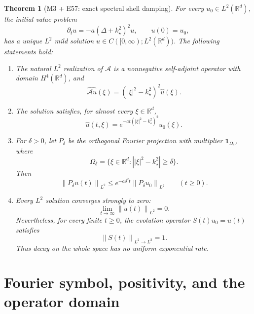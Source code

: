 \documentclass[11pt]{article}
\newtheorem{theorem}{Theorem}[section]
\theoremstyle{remark}
\newcommand{\R}{\mathbb{R}}
\newcommand{\sA}{\mathcal{A}}
\newcommand{\norm}[1]{\left\lVert #1\right\rVert}
\newcommand{\abs}[1]{\left\lvert #1\right\rvert}
\begin{document}
\begin{theorem}[M3 + E57: exact spectral shell damping]\label{thm:main}
For every $u_0\in L^2(\R^d)$, the initial-value problem
\begin{equation}\label{eq:flow}
\partial_tu=-a(\Delta+k_\star^2)^2u,
\qquad u(0)=u_0,
\end{equation}
has a unique $L^2$ mild solution $u\in C([0,\infty);L^2(\R^d))$.
The following statements hold:
\begin{enumerate}[label=\textup{(\roman*)}]
\item The natural $L^2$ realization of $\sA$ is a nonnegative
self-adjoint operator with domain $H^4(\R^d)$, and
\begin{equation}\label{eq:symbol}
\boxed{\widehat{\sA u}(\xi)
=(\abs{\xi}^2-k_\star^2)^2\widehat u(\xi).}
\end{equation}
\item The solution satisfies, for almost every $\xi\in\R^d$,
\begin{equation}\label{eq:semigroup}
\boxed{\widehat u(t,\xi)
=e^{-at(\abs{\xi}^2-k_\star^2)^2}\widehat u_0(\xi).}
\end{equation}
\item For $\delta>0$, let $P_\delta$ be the orthogonal Fourier projection
with multiplier $\mathbf 1_{\Omega_\delta}$, where
\begin{equation}\label{eq:omega}
\Omega_\delta
=\{\xi\in\R^d:\abs{\abs{\xi}^2-k_\star^2}\ge\delta\}.
\end{equation}
Then
\begin{equation}\label{eq:off-shell}
\boxed{\norm{P_\delta u(t)}_{L^2}
\le e^{-a\delta^2t}\norm{P_\delta u_0}_{L^2}}
\qquad (t\ge0).
\end{equation}
\item Every $L^2$ solution converges strongly to zero:
\begin{equation}\label{eq:strong-decay}
\lim_{t\to\infty}\norm{u(t)}_{L^2}=0.
\end{equation}
Nevertheless, for every finite $t\ge0$, the evolution operator
$S(t)u_0=u(t)$ satisfies
\begin{equation}\label{eq:operator-norm}
\norm{S(t)}_{L^2\to L^2}=1.
\end{equation}
Thus decay on the whole space has no uniform exponential rate.
\end{enumerate}
\end{theorem}

\section{Fourier symbol, positivity, and the operator domain}
\end{document}
